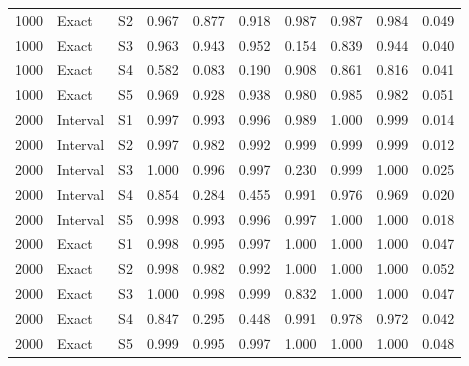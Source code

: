 \documentclass[12pt]{article}
\theoremstyle{definition}
\theoremstyle{remark}
\begin{document}
\begin{longtable}{rlcrrrrrrr}
1000 & Exact & S2 & 0.967 & 0.877 & 0.918 & 0.987 & 0.987 & 0.984 & 0.049 \\
1000 & Exact & S3 & 0.963 & 0.943 & 0.952 & 0.154 & 0.839 & 0.944 & 0.040 \\
1000 & Exact & S4 & 0.582 & 0.083 & 0.190 & 0.908 & 0.861 & 0.816 & 0.041 \\
1000 & Exact & S5 & 0.969 & 0.928 & 0.938 & 0.980 & 0.985 & 0.982 & 0.051 \\
2000 & Interval & S1 & 0.997 & 0.993 & 0.996 & 0.989 & 1.000 & 0.999 & 0.014 \\
2000 & Interval & S2 & 0.997 & 0.982 & 0.992 & 0.999 & 0.999 & 0.999 & 0.012 \\
2000 & Interval & S3 & 1.000 & 0.996 & 0.997 & 0.230 & 0.999 & 1.000 & 0.025 \\
2000 & Interval & S4 & 0.854 & 0.284 & 0.455 & 0.991 & 0.976 & 0.969 & 0.020 \\
2000 & Interval & S5 & 0.998 & 0.993 & 0.996 & 0.997 & 1.000 & 1.000 & 0.018 \\
2000 & Exact & S1 & 0.998 & 0.995 & 0.997 & 1.000 & 1.000 & 1.000 & 0.047 \\
2000 & Exact & S2 & 0.998 & 0.982 & 0.992 & 1.000 & 1.000 & 1.000 & 0.052 \\
2000 & Exact & S3 & 1.000 & 0.998 & 0.999 & 0.832 & 1.000 & 1.000 & 0.047 \\
2000 & Exact & S4 & 0.847 & 0.295 & 0.448 & 0.991 & 0.978 & 0.972 & 0.042 \\
2000 & Exact & S5 & 0.999 & 0.995 & 0.997 & 1.000 & 1.000 & 1.000 & 0.048 \\
\end{longtable}
\endgroup
\end{document}
